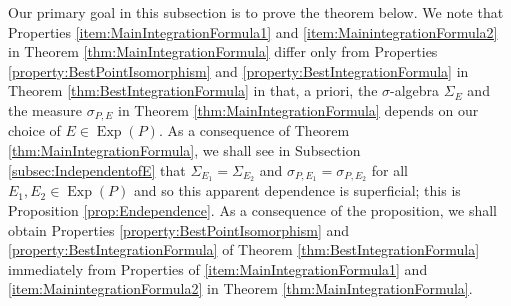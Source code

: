 \documentclass[11pt]{article}
\newcommand\Exp{\operatorname{Exp}}
\begin{document}
\noindent Our primary goal in this subsection is to prove the theorem below. We note that Properties \ref{item:MainIntegrationFormula1} and \ref{item:MainintegrationFormula2} in Theorem \ref{thm:MainIntegrationFormula} differ only from Properties \ref{property:BestPointIsomorphism} and \ref{property:BestIntegrationFormula} in Theorem \ref{thm:BestIntegrationFormula} in that, a priori, the $\sigma$-algebra $\Sigma_E$ and the measure $\sigma_{P,E}$ in Theorem \ref{thm:MainIntegrationFormula} depends on our choice of $E\in\Exp(P)$. As a consequence of Theorem \ref{thm:MainIntegrationFormula}, we shall see in Subsection \ref{subsec:IndependentofE} that $\Sigma_{E_1}=\Sigma_{E_2}$ and $\sigma_{P,E_1}=\sigma_{P,E_2}$ for all $E_1,E_2\in\Exp(P)$ and so this apparent dependence is superficial; this is Proposition \ref{prop:Endependence}. As a consequence of the proposition, we shall obtain Properties \ref{property:BestPointIsomorphism} and \ref{property:BestIntegrationFormula} of Theorem \ref{thm:BestIntegrationFormula} immediately from Properties of \ref{item:MainIntegrationFormula1} and \ref{item:MainintegrationFormula2} in Theorem \ref{thm:MainIntegrationFormula}.
\end{document}
